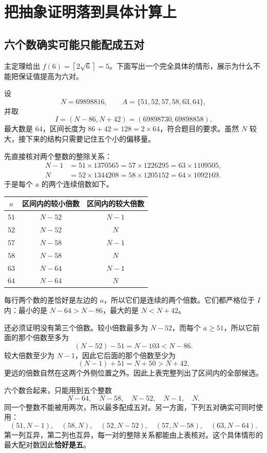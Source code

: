 \documentclass[UTF8,a4paper,oneside,openany,fontset=fandol,zihao=-4]{ctexbook}
\theoremstyle{guide}
\newcommand{\ceil}[1]{\left\lceil#1\right\rceil}
\begin{document}
\chapter{把抽象证明落到具体计算上}
\section{六个数确实可能只能配成五对}
主定理给出 $f(6)=\ceil{2\sqrt6}=5$。下面写出一个完全具体的情形，展示为什么不能把保证值提高为六对。

设
\[
N=69898816,\qquad A=\{51,52,57,58,63,64\},
\]
并取
\[
I=(N-86,N+42)=(69898730,69898858).
\]
最大数是 $64$，区间长度为 $86+42=128=2\times64$，符合题目的要求。虽然 $N$ 较大，接下来的结构只需要记住五个小的偏移量。

先直接核对两个整数的整除关系：
\[
\begin{aligned}
N-1&=51\times1370565=57\times1226295=63\times1109505,\\
N&=52\times1344208=58\times1205152=64\times1092169.
\end{aligned}
\]
于是每个 $a$ 的两个连续倍数如下。
\begin{center}
\begin{tabular}{ccc}
\toprule
$a$ & 区间内的较小倍数 & 区间内的较大倍数\\
\midrule
$51$ & $N-52$ & $N-1$\\
$52$ & $N-52$ & $N$\\
$57$ & $N-58$ & $N-1$\\
$58$ & $N-58$ & $N$\\
$63$ & $N-64$ & $N-1$\\
$64$ & $N-64$ & $N$\\
\bottomrule
\end{tabular}
\end{center}
每行两个数的差恰好是左边的 $a$，所以它们是连续的两个倍数。它们都严格位于 $I$ 内：最小的是 $N-64>N-86$，最大的是 $N<N+42$。

还必须证明没有第三个倍数。较小倍数最多为 $N-52$，而每个 $a\ge51$，所以它前面的那个倍数至多为
\[
(N-52)-51=N-103<N-86.
\]
较大倍数至少为 $N-1$，因此它后面的那个倍数至少为
\[
(N-1)+51=N+50>N+42.
\]
更远的倍数自然在这两个外侧位置之外。因此上表完整列出了区间内的全部候选。

六个数合起来，只能用到五个整数
\[
N-64,\quad N-58,\quad N-52,\quad N-1,\quad N.
\]
同一个整数不能被用两次，所以最多配成五对。另一方面，下列五对确实可同时使用：
\[
(51,N-1),\quad(58,N),\quad(52,N-52),\quad
(57,N-58),\quad(63,N-64).
\]
第一列互异，第二列也互异，每一对的整除关系都能由上表核对。这个具体情形的最大配对数因此\textbf{恰好是五}。
\end{document}
